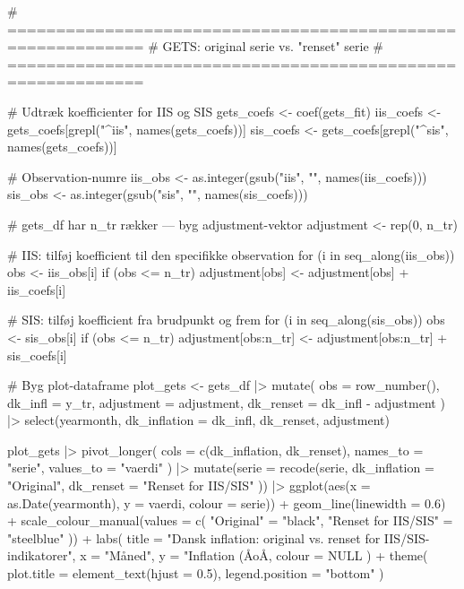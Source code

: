 # ============================================================
# GETS: original serie vs. "renset" serie
# ============================================================

# Udtræk koefficienter for IIS og SIS
gets_coefs <- coef(gets_fit)
iis_coefs  <- gets_coefs[grepl("^iis", names(gets_coefs))]
sis_coefs  <- gets_coefs[grepl("^sis", names(gets_coefs))]

# Observation-numre
iis_obs <- as.integer(gsub("iis", "", names(iis_coefs)))
sis_obs  <- as.integer(gsub("sis", "", names(sis_coefs)))

# gets_df har n_tr rækker — byg adjustment-vektor
adjustment <- rep(0, n_tr)

# IIS: tilføj koefficient til den specifikke observation
for (i in seq_along(iis_obs)) {
  obs <- iis_obs[i]
  if (obs <= n_tr) adjustment[obs] <- adjustment[obs] + iis_coefs[i]
}

# SIS: tilføj koefficient fra brudpunkt og frem
for (i in seq_along(sis_obs)) {
  obs <- sis_obs[i]
  if (obs <= n_tr) adjustment[obs:n_tr] <- adjustment[obs:n_tr] + sis_coefs[i]
}

# Byg plot-dataframe
plot_gets <- gets_df |>
  mutate(
    obs        = row_number(),
    dk_infl    = y_tr,
    adjustment = adjustment,
    dk_renset  = dk_infl - adjustment
  ) |>
  select(yearmonth, dk_inflation = dk_infl, dk_renset, adjustment)

plot_gets |>
  pivot_longer(
    cols      = c(dk_inflation, dk_renset),
    names_to  = "serie",
    values_to = "vaerdi"
  ) |>
  mutate(serie = recode(serie,
                        dk_inflation = "Original",
                        dk_renset    = "Renset for IIS/SIS"
  )) |>
  ggplot(aes(x = as.Date(yearmonth), y = vaerdi, colour = serie)) +
  geom_line(linewidth = 0.6) +
  scale_colour_manual(values = c(
    "Original"           = "black",
    "Renset for IIS/SIS" = "steelblue"
  )) +
  labs(
    title  = "Dansk inflation: original vs. renset for IIS/SIS-indikatorer",
    x      = "Måned",
    y      = "Inflation (ÅoÅ, %
    colour = NULL
  ) +
  theme(
    plot.title      = element_text(hjust = 0.5),
    legend.position = "bottom"
  )
